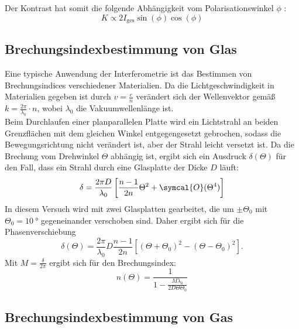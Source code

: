 \noindent Der Kontrast hat somit die folgende Abhängigkeit vom Polarisationswinkel $\phi$ :
\begin{equation}
    K \propto 2 I_{\text{ges}} \sin(\phi)\cos(\phi) \label{eqn:kontrastphi}
\end{equation}


\subsection{Brechungsindexbestimmung von Glas}

\noindent Eine typische Anwendung der Interferometrie ist das Bestimmen von Brechungsindices verschiedener Materialien. Da die Lichtgeschwindigkeit in Materialien gegeben ist durch
$ v = \frac{c}{n}$ verändert sich der Wellenvektor gemäß $ k = \frac{2 \pi}{\lambda_0} \cdot n$, wobei $\lambda_0$ die Vakuumwellenlänge ist. \\
Beim Durchlaufen einer planparallelen Platte wird ein Lichtstrahl an beiden Grenzflächen mit dem gleichen Winkel entgegengesetzt gebrochen, sodass die Bewegungsrichtung nicht
verändert ist, aber der Strahl leicht versetzt ist. Da die Brechung vom Drehwinkel $\Theta$ abhängig ist, ergibt sich ein Ausdruck $\delta(\Theta)$ für den Fall, dass ein Strahl durch 
eine Glasplatte der Dicke $D$ läuft:
\begin{equation*}
    \delta = \frac{2 \pi D}{\lambda_0} \left[ \frac{n-1}{2n} \Theta^2 + \symcal{O}(\Theta ^4)\right]
\end{equation*}
In diesem Versuch wird mit zwei Glasplatten gearbeitet, die um $ \pm \Theta_0$ mit $\Theta_0 = \SI{10}{\degree}$ gegeneinander verschoben sind. Daher ergibt 
sich für die Phasenverschiebung 
\begin{equation*}
    \delta(\Theta) = \frac{2 \pi}{\lambda_0} D \frac{n-1}{2n} \left[ (\Theta + \Theta_0)^2 - (\Theta - \Theta_0)^2 \right]. 
\end{equation*}
Mit $ M = \frac{\delta}{2 \pi} $ ergibt sich für den Brechungsindex:
\begin{equation}
    n(\Theta) = \frac{1}{1 - \frac{M \lambda_0}{2 D \Theta \Theta_0}}
    \label{eqn:n_Glas}
\end{equation}

\subsection{Brechungsindexbestimmung von Gas}

